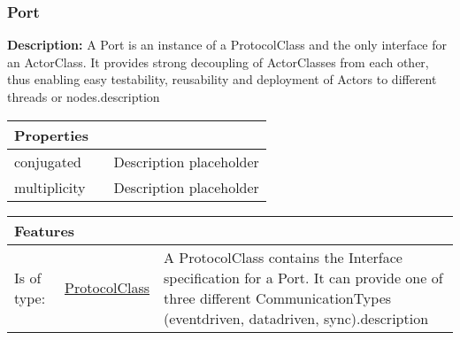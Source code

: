 		\subsubsection{\huge Port}
			\hypertarget{ref:Port}{}
			
			\textbf{Description:} A Port is an instance of a ProtocolClass and the only interface for an ActorClass. It provides strong decoupling of ActorClasses from each other, thus enabling easy testability, reusability and deployment of Actors to different threads or nodes.description 
			
			\begingroup
			\renewcommand{\arraystretch}{1.8} %
			\begin{longtable}{p{2.5cm}p{4cm} p{}}
				\multicolumn{2}{l}{\textbf{\large Properties}} \\
				\hline
			\tabitem conjugated &  & Description placeholder\\
			\tabitem multiplicity &  & Description placeholder\\
			\end{longtable}
			\endgroup
			
			\begingroup
			\renewcommand{\arraystretch}{1.8} %
			\begin{longtable}{p{2.5cm}|p{4cm} p{}}
				\multicolumn{2}{l}{\textbf{\large Features}} & \\
				\hline
			Is of type: & \tabitem \hyperlink{ref:ProtocolClass}{ProtocolClass}  & A ProtocolClass contains the Interface specification for a Port. It can provide one of three different CommunicationTypes (eventdriven, datadriven, sync).description \\
			\hline
			\end{longtable}
			\endgroup
			
